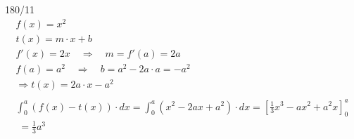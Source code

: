 \begin{exercise}{180/11}
  \begin{gather*}
    f(x) = x^2 \\
    t(x) = m \cdot x + b \\
    f'(x) = 2x \quad\Rightarrow\quad m = f'(a) = 2a \\
    f(a) = a^2 \quad\Rightarrow\quad b = a^2 - 2a \cdot a = -a^2 \\
    \Rightarrow t(x) = 2a \cdot x - a^2 \\\\
    \int_0^a (f(x) - t(x)) \cdot dx = \int_0^a (x^2 - 2ax + a^2) \cdot dx = \left[\frac{1}{3}x^3 - ax^2 + a^2x\right]_0^a \\
    \;= \frac{1}{3}a^3
  \end{gather*}
\end{exercise}
